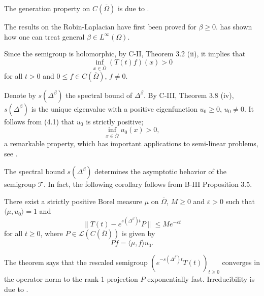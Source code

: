 %
%
The generation property on $C(\overline{\Omega})$ is due to \citet{Ni11}. 
%

The results on the Robin-Laplacian have first been proved for $ \beta \geq 0 $.
\citet{Dav09} has shown how one can treat general $ \beta \in L^{\infty}(\Omega ) $.

Since the semigroup is holomorphic, by C-II, Theorem 3.2 (ii), it implies that
\begin{equation*}  %
\inf_{x \in \overline{\Omega}} (T(t)f)(x) > 0
\end{equation*}
for all $t > 0$ and $0 \leq f \in C(\overline{\Omega})$, $f \neq 0$.

Denote by $s(\Delta^\beta)$ the spectral bound of $\Delta^\beta$. 
By C-III, Theorem 3.8 (iv), $s(\Delta^\beta)$ is the unique eigenvalue with a positive eigenfunction $u_0 \geq 0$, $u_0 \neq 0$. 
It follows from (4.1) that $u_0$ is strictly positive; \ie
\[
	\inf_{x \in \overline{\Omega}} u_0(x) > 0,
\]
a remarkable property, which has important applications to semi-linear problems, see \citet{AD25}.

The spectral bound $s(\Delta^\beta)$ determines the asymptotic behavior of the semigroup $\mathcal{T}$. 
In fact, the following corollary follows from B-III Proposition 3.5.
\begin{corollary} 
There exist a strictly positive Borel measure $\mu$ on $\overline{\Omega}$, $M \geq 0$ and $\varepsilon > 0$ such that $\langle \mu, u_0 \rangle = 1$ and
\[\|T(t) - e^{s(\Delta^\beta)t}P\| \leq Me^{-\varepsilon t}\]
for all $t \geq 0$, where $P \in \mathcal{L}(C(\overline{\Omega}))$ is given by
\[Pf = \langle \mu, f \rangle u_0.\]
\end{corollary}
The theorem says that the rescaled semigroup $(e^{-s(\Delta^\beta)t}T(t))_{t \geq 0}$ converges in the operator norm to the rank-1-projection $P$ exponentially fast.
Irreducibility is due to \citet[Theorem 4.5]{AEG20}.
